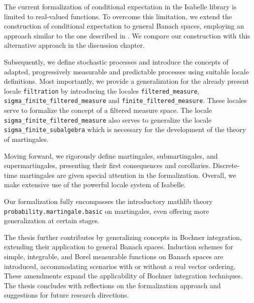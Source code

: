 The current formalization of conditional expectation in the Isabelle library is limited to real-valued functions. To overcome this limitation, we extend the construction of conditional expectation to general Banach spaces, employing an approach similar to the one described in  \cite{Hytoenen_2016}. We compare our construction with this alternative approach in the discussion chapter.

Subsequently, we define stochastic processes and introduce the concepts of adapted, progressively measurable and predictable processes using suitable locale definitions. Most importantly, we provide a generalization for the already present locale \lstinline{filtration} by introducing the locales \lstinline{filtered_measure}, \lstinline{sigma_finite_filtered_measure} and  \lstinline{finite_filtered_measure}. These locales serve to formalize the concept of a filtered measure space. The locale \lstinline{sigma_finite_filtered_measure} also serves to generalize the locale \lstinline{sigma_finite_subalgebra} which is necessary for the development of the theory of martingales.

Moving forward, we rigorously define martingales, submartingales, and supermartingales, presenting their first consequences and corollaries. Discrete-time martingales are given special attention in the formalization. Overall, we make extensive use of the powerful locale system of Isabelle.

Our formalization fully encompasses the introductory \textsf{mathlib} theory \texttt{probability.mar\-tingale.basic} on martingales, even offering more generalization at certain stages.

The thesis further contributes by generalizing concepts in Bochner integration, extending their application to general Banach spaces. Induction schemes for simple, integrable, and Borel measurable functions on Banach spaces are introduced, accommodating scenarios with or without a real vector ordering. These amendments expand the applicability of Bochner integration techniques.
The thesis concludes with reflections on the formalization approach and suggestions for future research directions.